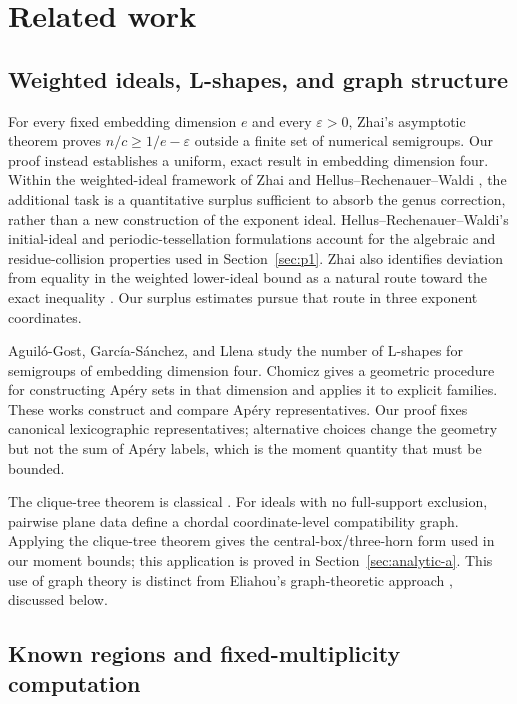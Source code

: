 \section{Related work}\label{sec:related}

\subsection{Weighted ideals, L-shapes, and graph structure}

For every fixed embedding dimension \(e\) and every \(\varepsilon>0\),
Zhai's asymptotic theorem \cite{Z} proves
\(n/c\ge 1/e-\varepsilon\) outside a finite set of numerical semigroups.
Our proof instead establishes a uniform, exact result in embedding dimension
four. Within the weighted-ideal framework of Zhai and
Hellus--Rechenauer--Waldi \cite{HRW}, the additional task is a quantitative
surplus sufficient to absorb the genus correction, rather than a new
construction of the exponent ideal.
Hellus--Rechenauer--Waldi's initial-ideal and periodic-tessellation
formulations account for the algebraic and residue-collision properties used
in Section~\ref{sec:p1}.
Zhai also identifies deviation from equality in the weighted lower-ideal
bound as a natural route toward the exact inequality \cite[Section~5]{Z}.
Our surplus estimates pursue that route in three exponent coordinates.

Aguil\'o-Gost, Garc\'ia-S\'anchez, and Llena \cite{L} study the number
of L-shapes for semigroups of embedding dimension four. Chomicz
\cite{C} gives a geometric procedure for constructing Ap\'ery sets
in that dimension and applies it to explicit families. These works construct
and compare Ap\'ery representatives. Our proof fixes canonical lexicographic
representatives; alternative choices change the geometry but not the sum of
Ap\'ery labels, which is the moment quantity that must be bounded.

The clique-tree theorem is classical \cite{G}. For ideals with no
full-support exclusion, pairwise plane data define a chordal coordinate-level
compatibility graph. Applying the clique-tree theorem gives the
central-box/three-horn form used in our moment bounds; this application is
proved in Section~\ref{sec:analytic-a}.
This use of graph theory is distinct from Eliahou's graph-theoretic approach
\cite{Graph}, discussed below.

\subsection{Known regions and fixed-multiplicity computation}

